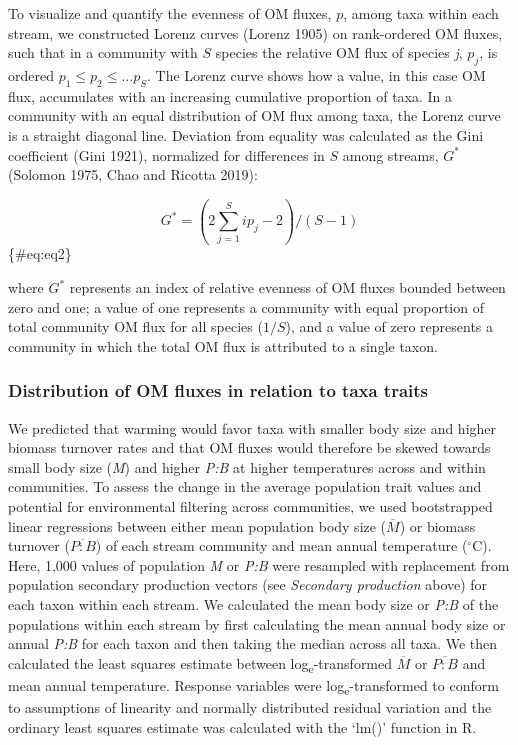 \documentclass[
]{article}
\numberwithin{equation}
\begin{document}
To visualize and quantify the evenness of OM fluxes, \(p\), among taxa
within each stream, we constructed Lorenz curves (Lorenz 1905) on
rank-ordered OM fluxes, such that in a community with \(S\) species the
relative OM flux of species \emph{j}, \(p_j\), is ordered
\(p_1 \leq p_2 \leq ... p_S\). The Lorenz curve shows how a value, in
this case OM flux, accumulates with an increasing cumulative proportion
of taxa. In a community with an equal distribution of OM flux among
taxa, the Lorenz curve is a straight diagonal line. Deviation from
equality was calculated as the Gini coefficient (Gini 1921), normalized
for differences in \(S\) among streams, \(G^*\) (Solomon 1975, Chao and
Ricotta 2019):

\[ G^* = (2 \sum_{j = 1}^S ip_j -2)/(S-1)\] \{\#eq:eq2\}

where \(G^*\) represents an index of relative evenness of OM fluxes
bounded between zero and one; a value of one represents a community with
equal proportion of total community OM flux for all species (\(1/S\)),
and a value of zero represents a community in which the total OM flux is
attributed to a single taxon.

\hypertarget{distribution-of-om-fluxes-in-relation-to-taxa-traits}{%
\subsubsection{Distribution of OM fluxes in relation to taxa
traits}\label{distribution-of-om-fluxes-in-relation-to-taxa-traits}}

We predicted that warming would favor taxa with smaller body size and
higher biomass turnover rates and that OM fluxes would therefore be
skewed towards small body size (\emph{M}) and higher \emph{P:B} at
higher temperatures across and within communities. To assess the change
in the average population trait values and potential for environmental
filtering across communities, we used bootstrapped linear regressions
between either mean population body size (\(\overline{M}\)) or biomass
turnover (\(\overline{P:B}\)) of each stream community and mean annual
temperature (\(^\circ\)C). Here, 1,000 values of population \emph{M} or
\emph{P:B} were resampled with replacement from population secondary
production vectors (see \emph{Secondary production} above) for each
taxon within each stream. We calculated the mean body size or \emph{P:B}
of the populations within each stream by first calculating the mean
annual body size or annual \emph{P:B} for each taxon and then taking the
median across all taxa. We then calculated the least squares estimate
between log\textsubscript{e}-transformed \(\overline{M}\) or
\(\overline{P:B}\) and mean annual temperature. Response variables were
log\textsubscript{e}-transformed to conform to assumptions of linearity
and normally distributed residual variation and the ordinary least
squares estimate was calculated with the `lm()' function in R.
\end{document}
